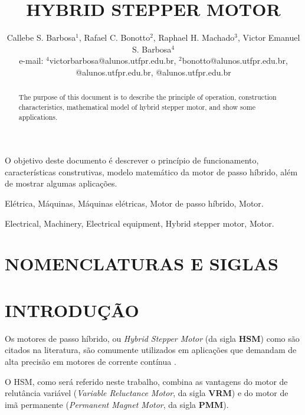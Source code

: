 \documentclass[portugues]{sobraep}
\title{HYBRID STEPPER MOTOR}
\author{Callebe S. Barbosa$^{1}$, Rafael C. Bonotto$^{2}$, Raphael H. Machado$^{3}$, Victor Emanuel S. Barbosa$^{4}$\\
	\normalsize e-mail: $^{4}$victorbarbosa@alunos.utfpr.edu.br, $^{2}$bonotto@alunos.utfpr.edu.br, @alunos.utfpr.edu.br, @alunos.utfpr.edu.br
}
\begin{document}
\maketitle

\begin{resumo}
	O objetivo deste documento é descrever o princípio de funcionamento, características construtivas, modelo matemático da motor de passo híbrido, além de mostrar algumas aplicações.
\end{resumo}

\begin{palavraschave}
	Elétrica, Máquinas, Máquinas elétricas, Motor de passo híbrido, Motor.
\end{palavraschave}

\englishtitle

\begin{abstract}
	The purpose of this document is to describe the principle of operation, construction characteristics, mathematical model of hybrid stepper motor, and show some applications.
\end{abstract}

\begin{keywords}
	Electrical, Machinery, Electrical equipment, Hybrid stepper motor, Motor.
\end{keywords}

\section*{NOMENCLATURAS E SIGLAS}



\section{INTRODUÇÃO}
	
	Os motores de passo híbrido, ou \textit{Hybrid Stepper Motor} (da sigla \textbf{HSM}) como são citados na literatura, são comumente utilizados em aplicações que demandam de alta precisão em motores de corrente contínua \cite{ieeeRusso}.
	
	O HSM, como será referido neste trabalho, combina as vantagens do motor de relutância variável (\textit{Variable Reluctance Motor}, da sigla \textbf{VRM}) e do motor de imã permanente (\textit{Permanent Magnet Motor}, da sigla \textbf{PMM}). 
	
\end{document}
